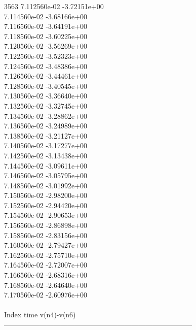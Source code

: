 3563	7.112560e-02	-3.72151e+00	\\ 	7.114560e-02	-3.68166e+00	\\ 	7.116560e-02	-3.64191e+00	\\ 	7.118560e-02	-3.60225e+00	\\ 	7.120560e-02	-3.56269e+00	\\ 	7.122560e-02	-3.52323e+00	\\ 	7.124560e-02	-3.48386e+00	\\ 	7.126560e-02	-3.44461e+00	\\ 	7.128560e-02	-3.40545e+00	\\ 	7.130560e-02	-3.36640e+00	\\ 	7.132560e-02	-3.32745e+00	\\ 	7.134560e-02	-3.28862e+00	\\ 	7.136560e-02	-3.24989e+00	\\ 	7.138560e-02	-3.21127e+00	\\ 	7.140560e-02	-3.17277e+00	\\ 	7.142560e-02	-3.13438e+00	\\ 	7.144560e-02	-3.09611e+00	\\ 	7.146560e-02	-3.05795e+00	\\ 	7.148560e-02	-3.01992e+00	\\ 	7.150560e-02	-2.98200e+00	\\ 	7.152560e-02	-2.94420e+00	\\ 	7.154560e-02	-2.90653e+00	\\ 	7.156560e-02	-2.86898e+00	\\ 	7.158560e-02	-2.83156e+00	\\ 	7.160560e-02	-2.79427e+00	\\ 	7.162560e-02	-2.75710e+00	\\ 	7.164560e-02	-2.72007e+00	\\ 	7.166560e-02	-2.68316e+00	\\ 	7.168560e-02	-2.64640e+00	\\ 	7.170560e-02	-2.60976e+00	\\ \hline
\\ \hline
Index   time            v(n4)-v(n6)     \\ \hline
--------------------------------------------------------------------------------\\ \hline
